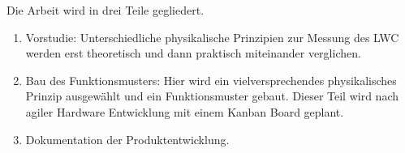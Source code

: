 Die Arbeit wird in drei Teile gegliedert.

\begin{enumerate}
\item Vorstudie: Unterschiedliche physikalische Prinzipien zur Messung des LWC werden erst theoretisch und dann praktisch miteinander verglichen.

\item Bau des Funktionsmusters:  Hier wird ein vielversprechendes physikalisches Prinzip ausgewählt und ein Funktionsmuster gebaut. Dieser Teil wird nach agiler Hardware Entwicklung mit einem Kanban Board geplant.

\item Dokumentation der Produktentwicklung.
\end{enumerate}



\iffalse
Die Arbeit wird in drei Teile aufgegliedert.

in einer Vorstudie werden unterschidilche physikalische Prinzipien zur messung des LWC theoritisch und praktisch mit eineander verglichen.

bau den Funktionsmusters. hier wird ein vielversprechendes physikalisches prinzip ausgewählt und ein Funktionsmuster gebaut. dieser teil wird nach agiler hardware Entwicklung mit einem Kanbanboard geplant.

Der dritte Teil wird genutzt um die Dokumentation der Produktentwicklung und Entwicklete Messtechnik beschrieben.
\fi
